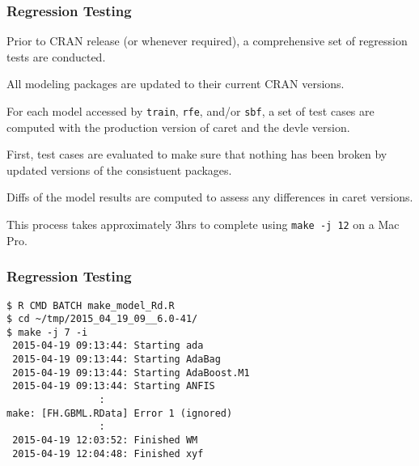 \documentclass[12 pt]{beamer}\usepackage[]{graphicx}\usepackage[]{color}
\newcommand{\hlkwd}[1]{\textcolor[rgb]{0.78,0.227,0.412}{#1}}%
\newcommand{\mxkwd}[1]{\texttt{\hlkwd{#1}}}%
\newcommand{\pkg}[1]{{\fontseries{b}\selectfont #1}}
\renewcommand{\pkg}[1]{{\color{darkgreen}\textsf{#1}}}
\begin{document}
  \begin{frame}[fragile]
\frametitle{Regression Testing}

Prior to CRAN release (or whenever required), a comprehensive set of regression tests are conducted.

\vspace{.1in}

All modeling packages are updated to their current CRAN versions.

\vspace{.1in}

For each model accessed by \mxkwd{train}, \mxkwd{rfe}, and/or \mxkwd{sbf}, a set of test cases are computed with the production version of \pkg{caret} and the devle version. 

\vspace{.1in}

First, test cases are evaluated to make sure that nothing has been broken by updated versions of the consistuent packages. 

\vspace{.1in}

Diffs of the model results are computed to assess any differences in \pkg{caret} versions.

\vspace{.1in}

This process takes approximately 3hrs to complete using \texttt{make -j 12} on a Mac Pro. 

\end{frame}


  
  \begin{frame}[fragile]
\frametitle{Regression Testing}

\begin{Verbatim}[fontsize=\footnotesize]
$ R CMD BATCH make_model_Rd.R
$ cd ~/tmp/2015_04_19_09__6.0-41/
$ make -j 7 -i 
 2015-04-19 09:13:44: Starting ada
 2015-04-19 09:13:44: Starting AdaBag
 2015-04-19 09:13:44: Starting AdaBoost.M1
 2015-04-19 09:13:44: Starting ANFIS
                :
make: [FH.GBML.RData] Error 1 (ignored)                
                :
 2015-04-19 12:03:52: Finished WM
 2015-04-19 12:04:48: Finished xyf
\end{Verbatim}

\end{frame}



  
\end{document}
